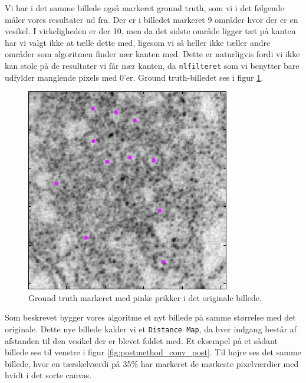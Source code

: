 Vi har i det samme billede også markeret ground truth, som vi i det følgende måler vores resultater ud fra. Der er i billedet markeret 9 områder hvor der er en vesikel. I virkeligheden er der 10, men da det sidste område ligger tæt på kanten har vi valgt ikke at tælle dette med, ligesom vi så heller ikke tæller andre områder som algoritmen finder nær kanten med. Dette er naturligvis fordi vi ikke kan stole på de resultater vi får nær kanten, da \texttt{nlfilteret} som vi benytter bare udfylder manglende pixels med 0'er. Ground truth-billedet ses i figur \ref{fig:postmethod_conv_gt}. 

\begin{figure}[H]
		\centering
		\includegraphics[scale=0.65]{files/postmethod/img/ground_truth.png}
	\caption{Ground truth markeret med pinke prikker i det originale billede.\label{fig:postmethod_conv_gt}}
\end{figure}

Som beskrevet bygger vores algoritme et nyt billede på samme størrelse med det originale. Dette nye billede kalder vi et \texttt{Distance Map}, da hver indgang består af afstanden til den vesikel der er blevet foldet med. Et eksempel på et sådant billede ses til venstre i figur \ref{fig:postmethod_conv_post}. Til højre ses det samme billede, hvor en tærskelværdi på 35\% har markeret de mørkeste pixelværdier med hvidt i det sorte canvas.


